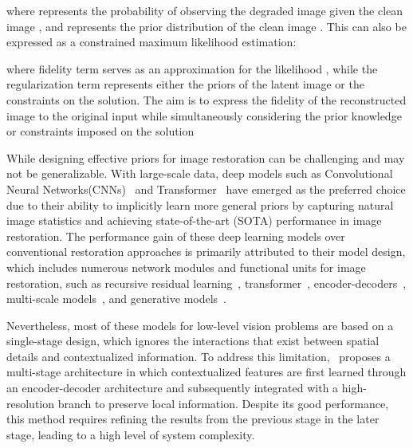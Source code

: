 \documentclass[sn-mathphys,Numbered]{sn-jnl}
\theoremstyle{thmstyleone}\newtheorem{theorem}{Theorem}\newtheorem{proposition}[theorem]{Proposition}
\theoremstyle{thmstyletwo}\newtheorem{example}{Example}\newtheorem{remark}{Remark}
\theoremstyle{thmstylethree}\newtheorem{definition}{Definition}
\begin{document}
where  represents the probability of observing the degraded image  given the clean image , and  represents the prior distribution of the clean image . This can also be expressed as a constrained maximum likelihood estimation:

where fidelity term  serves as an approximation for the likelihood , while the regularization term  represents either the priors of the latent image  or the constraints on the solution. The aim is to express the fidelity of the reconstructed image to the original input while simultaneously considering the prior knowledge or constraints imposed on the solution

While designing effective priors for image restoration can be challenging and may not be generalizable.  With large-scale data, deep models such as Convolutional Neural Networks(CNNs)~\cite{Zamir2021MPRNet, Chen_2021_CVPR,PREnet,RESCAN,chen2022simple,chu2022nafssr, 2022Learning} and Transformer~\cite{zhang2023accurate, Zamir2021Restormer, Tsai2022Stripformer,Wang_2022_CVPR} have emerged as the preferred choice due to their ability to implicitly learn more general priors by capturing natural image statistics and achieving state-of-the-art (SOTA) performance in image restoration. The performance gain of these deep learning models over conventional restoration approaches is primarily attributed to their model design, which includes numerous network modules and functional units for image restoration, such as recursive residual learning~\cite{Wang2018ESRGANES}, transformer~\cite{Zamir2021Restormer, zhang2023accurate, Wang_2022_CVPR}, encoder-decoders~\cite{RFB15a,chen2022simple,chu2022nafssr}, multi-scale models~\cite{Mssnet,9156921}, and generative models~\cite{Degan,DBGAN,deganv2}.

Nevertheless, most of these models for low-level vision problems are based on a single-stage design, which ignores the interactions that exist between spatial details and contextualized information. To address this limitation,~\cite{Zamir2021MPRNet, Chen_2021_CVPR,PREnet,RESCAN} proposes a multi-stage architecture in which contextualized features are first learned through an encoder-decoder architecture and subsequently integrated with a high-resolution branch to preserve local information. Despite its good performance, this method requires refining the results from the previous stage in the later stage, leading to a high level of system complexity.
\end{document}
